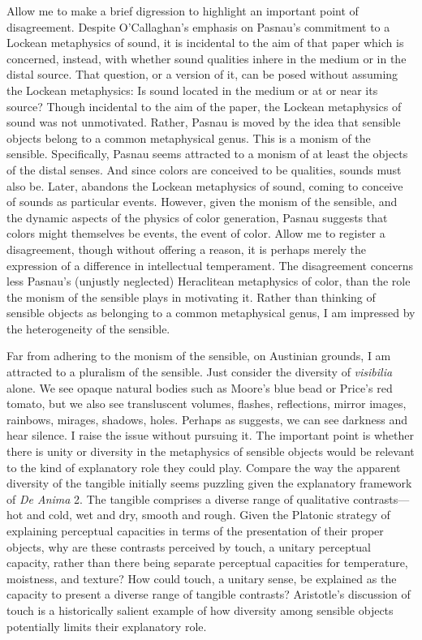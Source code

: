 Allow me to make a brief digression to highlight an important point of disagreement. Despite O'Callaghan's \citeyearpar{OCallaghan:2009aa} emphasis on Pasnau's \citeyearpar{Pasnau:1999ss} commitment to a Lockean metaphysics of sound, it is incidental to the aim of that paper which is concerned, instead, with whether sound qualities inhere in the medium or in the distal source. That question, or a version of it, can be posed without assuming the Lockean metaphysics: Is sound located in the medium or at or near its source? Though incidental to the aim of the paper, the Lockean metaphysics of sound was not unmotivated. Rather, Pasnau is moved by the idea that sensible objects belong to a common metaphysical genus. This is a monism of the sensible. Specifically, Pasnau seems attracted to a monism of at least the objects of the distal senses. And since colors are conceived to be qualities, sounds must also be. Later, \citet{Pasnau:2009ys} abandons the Lockean metaphysics of sound, coming to conceive of sounds as particular events. However, given the monism of the sensible, and the dynamic aspects of the physics of color generation, Pasnau suggests that colors might themselves be events, the event of color. Allow me to register a disagreement, though without offering a reason, it is perhaps merely the expression of a difference in intellectual temperament. The disagreement concerns less Pasnau's (unjustly neglected) Heraclitean metaphysics of color, than the role the monism of the sensible plays in motivating it. Rather than thinking of sensible objects as belonging to a common metaphysical genus, I am impressed by the heterogeneity of the sensible. 

Far from adhering to the monism of the sensible, on Austinian grounds, I am attracted to a pluralism of the sensible. Just consider the diversity of \emph{visibilia} alone. We see opaque natural bodies such as Moore's \citeyearpar{Moore:1903uo} blue bead or Price's \citeyearpar{Price:1932fk} red tomato, but we also see transluscent volumes, flashes, reflections, mirror images, rainbows, mirages, shadows, holes. Perhaps as \citet{Sorensen:2004jk,Sorensen:2008kx,Sorensen:2009aa} suggests, we can see darkness and hear silence. I raise the issue without pursuing it. The important point is whether there is unity or diversity in the metaphysics of sensible objects would be relevant to the kind of explanatory role they could play. Compare the way the apparent diversity of the tangible initially seems puzzling given the explanatory framework of \emph{De Anima} 2. The tangible comprises a diverse range of qualitative contrasts---hot and cold, wet and dry, smooth and rough. Given the Platonic strategy of explaining perceptual capacities in terms of the presentation of their proper objects, why are these contrasts perceived by touch, a unitary perceptual capacity, rather than there being separate perceptual capacities for temperature, moistness, and texture? How could touch, a unitary sense, be explained as the capacity to present a diverse range of tangible contrasts? Aristotle's discussion of touch is a historically salient example of how diversity among sensible objects potentially limits their explanatory role.

